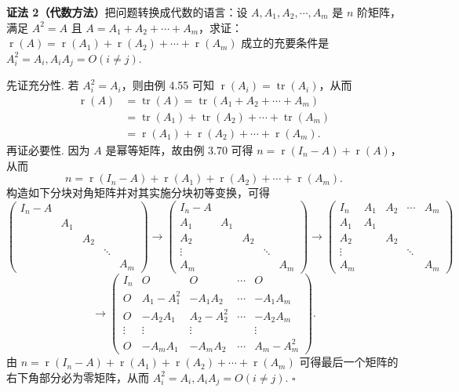 \documentclass[UTF8, 12pt, fontset=fandol, oneside]{ctexart}
\begin{document}
\noindent\textbf{证法 2（代数方法）}\quad 把问题转换成代数的语言：设 $A,A_1,A_2,\cdots,A_m$ 是 $n$ 阶矩阵，满足 $A^2=A$ 且 $A=A_1+A_2+\cdots+A_m$，求证：$\operatorname{r}(A)=\operatorname{r}(A_1)+\operatorname{r}(A_2)+\cdots+\operatorname{r}(A_m)$ 成立的充要条件是 $A_i^2=A_i,A_iA_j=O(i\ne j)$.

先证充分性. 若 $A_i^2=A_i$，则由例 4.55 可知 $\operatorname{r}(A_i)=\operatorname{tr}(A_i)$，从而
\[
\begin{aligned}
\operatorname{r}(A)
&=\operatorname{tr}(A)=\operatorname{tr}(A_1+A_2+\cdots+A_m)\\
&=\operatorname{tr}(A_1)+\operatorname{tr}(A_2)+\cdots+\operatorname{tr}(A_m)\\
&=\operatorname{r}(A_1)+\operatorname{r}(A_2)+\cdots+\operatorname{r}(A_m).
\end{aligned}
\]
再证必要性. 因为 $A$ 是幂等矩阵，故由例 3.70 可得 $n=\operatorname{r}(I_n-A)+\operatorname{r}(A)$，从而
\[
n=\operatorname{r}(I_n-A)+\operatorname{r}(A_1)+\operatorname{r}(A_2)+\cdots+\operatorname{r}(A_m).
\]
构造如下分块对角矩阵并对其实施分块初等变换，可得
\[
\left(\begin{array}{ccccc}
I_n-A &        &        &        & \\
      & A_1    &        &        & \\
      &        & A_2    &        & \\
      &        &        & \ddots & \\
      &        &        &        & A_m
\end{array}\right)
\to
\left(\begin{array}{ccccc}
I_n-A &        &        &        & \\
A_1   & A_1    &        &        & \\
A_2   &        & A_2    &        & \\
\vdots&        &        & \ddots & \\
A_m   &        &        &        & A_m
\end{array}\right)
\to
\left(\begin{array}{ccccc}
I_n & A_1 & A_2 & \cdots & A_m\\
A_1 & A_1 &     &        & \\
A_2 &     & A_2 &        & \\
\vdots &  &     & \ddots & \\
A_m &    &     &        & A_m
\end{array}\right)
\]
\[
\to
\left(\begin{array}{ccccc}
I_n & O & O & \cdots & O\\
O & A_1-A_1^2 & -A_1A_2 & \cdots & -A_1A_m\\
O & -A_2A_1 & A_2-A_2^2 & \cdots & -A_2A_m\\
\vdots & \vdots & \vdots &        & \vdots\\
O & -A_mA_1 & -A_mA_2 & \cdots & A_m-A_m^2
\end{array}\right).
\]
由 $n=\operatorname{r}(I_n-A)+\operatorname{r}(A_1)+\operatorname{r}(A_2)+\cdots+\operatorname{r}(A_m)$ 可得最后一个矩阵的右下角部分必为零矩阵，从而 $A_i^2=A_i,A_iA_j=O(i\ne j)$. $\square$
\end{document}
